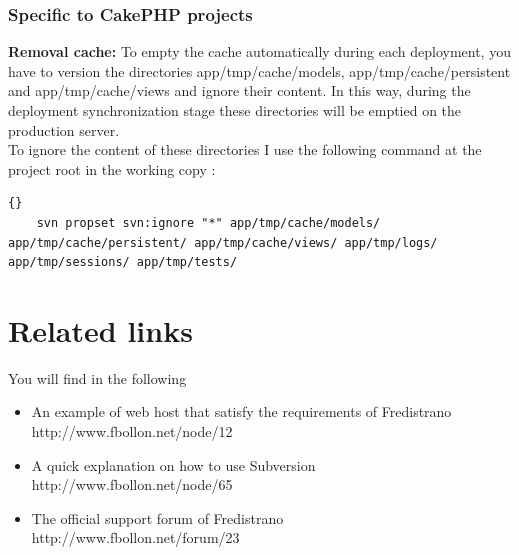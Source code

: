 \documentclass[12pt,a4paper]{report}
\begin{document}
\subsection{Specific to CakePHP projects} %
\begin{list}{-}{}
	\item \textbf{Removal cache:} To empty the cache automatically during each deployment, you have to version the directories app/tmp/cache/models, app/tmp/cache/persistent and app/tmp/cache/views and ignore their content. In this way, during the deployment synchronization stage these directories will be emptied on the production server.\\
	To ignore the content of these directories I use the following command at the project root in the working copy :
	\lstset{language=bash}
	\lstset{breaklines=true}
	\lstset{tabsize=1}
	\begin{lstlisting}[frame=tb]{}
	svn propset svn:ignore "*" app/tmp/cache/models/ app/tmp/cache/persistent/ app/tmp/cache/views/ app/tmp/logs/ app/tmp/sessions/ app/tmp/tests/
	\end{lstlisting}
\end{list}




\chapter{Related links}
You will find in the following 
\begin{itemize}
\item An example of web host that satisfy the requirements of Fredistrano \\ http://www.fbollon.net/node/12 \\
\item A quick explanation on how to use Subversion \\ http://www.fbollon.net/node/65 \\
\item The official support forum of Fredistrano \\ http://www.fbollon.net/forum/23
\end{itemize}
\end{document}
